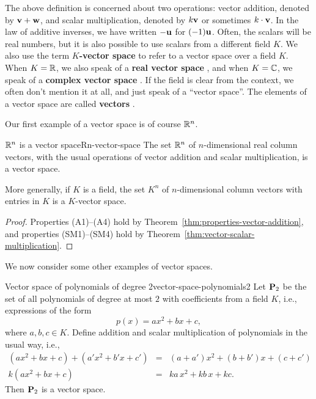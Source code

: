 The above definition is concerned about two operations: vector
addition, denoted by $\mbox{\bf v} + \mbox{\bf w}$, and scalar multiplication,
denoted by $k\mbox{\bf v}$ or sometimes $k\cdot\mbox{\bf v}$. In the law of
additive inverses, we have written $-\mbox{\bf u}$ for $(-1)\mbox{\bf u}$.
Often, the scalars will be real numbers, but it is also possible to
use scalars from a different field $K$. We also use the term
\textbf{$K$-vector space}%
 to refer to a vector space
over a field $K$.  When $K=\mathbb{R}$, we also speak of a \textbf{real vector
  space}%
%
, and when $K=\mathbb{C}$, we speak of a
\textbf{complex vector space}%
%
. If the field is clear from the context,
we often don't mention it at all, and just speak of a ``vector
space''. The elements of a vector space are called \textbf{vectors}%
.

Our first example of a vector space is of course $\mathbb{R}^n$.

\begin{example}{$\mathbb{R}^n$ is a vector space}{Rn-vector-space}
  The set $\mathbb{R}^n$ of $n$-dimensional real column vectors, with the
  usual operations of vector addition and scalar multiplication, is a
  vector space.

  More generally, if $K$ is a field, the set $K^n$ of $n$-dimensional
  column vectors with entries in $K$ is a $K$-vector space.
\end{example}

\begin{proof}
  Properties (A1)--(A4) hold by
  Theorem~\ref{thm:properties-vector-addition}, and properties
  (SM1)--(SM4) hold by Theorem~\ref{thm:vector-scalar-multiplication}.
\end{proof}

We now consider some other examples of vector spaces.

\begin{example}{Vector space of polynomials of degree 2}{vector-space-polynomials2}
  Let $\mathbf{P}_2$%
   be the set of all polynomials%
   of degree at most $2$ with coefficients from a
  field $K$, i.e., expressions of the form
  \begin{equation*}
    p(x) = ax^2 + bx + c,
  \end{equation*}
  where $a,b,c\in K$. Define addition%
   and scalar multiplication%
   of polynomials in the
  usual way, i.e.,
  \begin{eqnarray*}
    (ax^2 + bx + c) + (a'x^2 + b'x + c') &=& (a + a')x^2 + (b + b')x + (c + c') \\
    k(ax^2 + bx + c) &=& ka\,x^2 + kb\,x + kc.
  \end{eqnarray*}
  Then $\mathbf{P}_2$ is a vector space.
\end{example}

